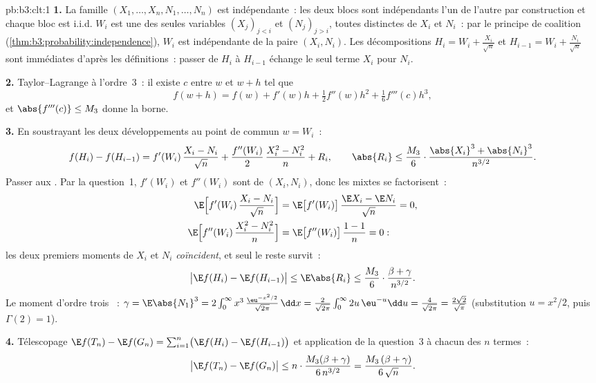 \begin{solution}{pb:b3:clt:1}
\textbf{1.} La famille $(X_1, \dots, X_n, N_1, \dots, N_n)$
est indépendante~: les deux blocs sont indépendants l'un de
l'autre par construction et chaque bloc est i.i.d. $W_i$ est
une  des seules variables $(X_j)_{j<i}$ et
$(N_j)_{j>i}$, toutes distinctes de $X_i$ et $N_i$~: par le
principe de coalition
(\cref{thm:b3:probability:independence}), $W_i$ est
indépendante de la paire $(X_i, N_i)$. Les décompositions
$H_i = W_i + \frac{X_i}{\sqrt n}$ et $H_{i-1} = W_i +
\frac{N_i}{\sqrt n}$ sont immédiates d'après les définitions~:
passer de $H_i$ à $H_{i-1}$ échange le seul terme $X_i$ pour
$N_i$.

\textbf{2.} Taylor--Lagrange à l'ordre~$3$~: il existe $c$
entre $w$ et $w + h$ tel que
\[
f(w + h) = f(w) + f'(w)h + \tfrac12 f''(w)h^2 + \tfrac16 f'''(c)h^3,
\]
et $\abs{f'''(c)} \leq M_3$ donne la borne.

\textbf{3.} En soustrayant les deux développements au point de
 commun $w = W_i$~:
\[
f(H_i) - f(H_{i-1}) = f'(W_i)\,\frac{X_i - N_i}{\sqrt n} +
\frac{f''(W_i)}{2}\,\frac{X_i^2 - N_i^2}{n} + R_i,
\qquad
\abs{R_i} \leq \frac{M_3}{6}\cdot
\frac{\abs{X_i}^3 + \abs{N_i}^3}{n^{3/2}} .
\]
Passer aux . Par la question~1, $f'(W_i)$ et
$f''(W_i)$ sont  de $(X_i, N_i)$, donc les
 mixtes se factorisent~:
\begin{align*}
\E\Bigl[f'(W_i)\,\frac{X_i - N_i}{\sqrt n}\Bigr] &=
\E\bigl[f'(W_i)\bigr]\,\frac{\E X_i - \E N_i}{\sqrt n} = 0,
\\
\E\Bigl[f''(W_i)\,\frac{X_i^2 - N_i^2}{n}\Bigr] &=
\E\bigl[f''(W_i)\bigr]\,\frac{1 - 1}{n} = 0 :
\end{align*}
les deux premiers moments de $X_i$ et $N_i$ \emph{coïncident},
et seul le reste survit~:
\[
\bigl|\E f(H_i) - \E f(H_{i-1})\bigr| \leq \E\abs{R_i} \leq
\frac{M_3}{6}\cdot\frac{\beta + \gamma}{n^{3/2}} .
\]
Le moment d'ordre trois ~: $\gamma = \E\abs{N_1}^3 =
2\int_0^\infty x^3\,\frac{\eu^{-x^2/2}}{\sqrt{2\pi}}\,\dd x
= \frac{2}{\sqrt{2\pi}}\int_0^\infty 2u\,\eu^{-u}\dd u =
\frac{4}{\sqrt{2\pi}} = \frac{2\sqrt2}{\sqrt\pi}$
(substitution $u = x^2/2$, puis $\Gamma(2) = 1$).

\textbf{4.} Télescopage $\E f(T_n) - \E f(G_n) =
\sum_{i=1}^n\bigl(\E f(H_i) - \E f(H_{i-1})\bigr)$ et
application de la question~3 à chacun des $n$ termes~:
\[
\bigl|\E f(T_n) - \E f(G_n)\bigr| \leq
n \cdot \frac{M_3(\beta + \gamma)}{6\,n^{3/2}} =
\frac{M_3\,(\beta + \gamma)}{6\,\sqrt n} .
\]


\end{solution}
